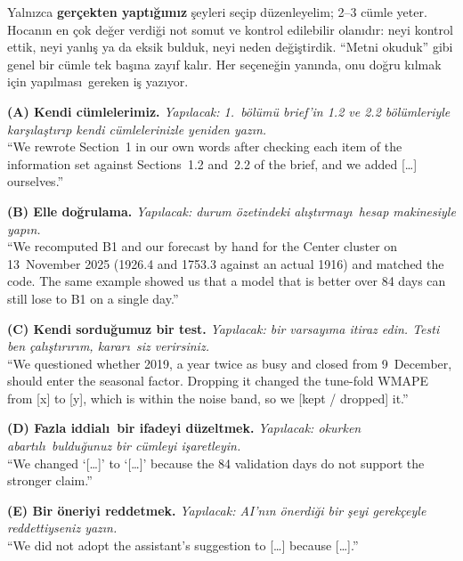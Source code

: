 \documentclass[10pt,a4paper]{article}
\begin{document}
\begin{tcolorbox}[enhanced, breakable, colback=red!2, colframe=red!55!black, boxrule=0.6pt,
  arc=2pt, left=6pt, right=6pt, top=4pt, bottom=4pt, fontupper=\small,
  title={\small\bfseries TASLAK -- grup i\c{c}in \"{o}neriler. Teslimden \"{o}nce bu kutuyu silin.}]
Yaln\i zca \textbf{ger\c{c}ekten yapt\i\u{g}\i m\i z} \c{s}eyleri se\c{c}ip d\"{u}zenleyelim; 2--3 c\"{u}mle yeter.
Hocan\i n en \c{c}ok de\u{g}er verdi\u{g}i not somut ve kontrol edilebilir olan\i d\i r: neyi kontrol ettik,
neyi yanl\i\c{s} ya da eksik bulduk, neyi neden de\u{g}i\c{s}tirdik. ``Metni okuduk'' gibi genel bir c\"{u}mle
tek ba\c{s}\i na zay\i f kal\i r. Her se\c{c}ene\u{g}in yan\i nda, onu do\u{g}ru k\i lmak i\c{c}in yap\i lmas\i\ gereken i\c{s} yaz\i yor.

\smallskip
\textbf{(A) Kendi c\"{u}mlelerimiz.} \emph{Yap\i lacak: 1.\ b\"{o}l\"{u}m\"{u} brief'in 1.2 ve 2.2 b\"{o}l\"{u}mleriyle
kar\c{s}\i la\c{s}t\i r\i p kendi c\"{u}mlelerinizle yeniden yaz\i n.}\\
``We rewrote Section~1 in our own words after checking each item of the information set against
Sections~1.2 and~2.2 of the brief, and we added [\dots] ourselves.''

\smallskip
\textbf{(B) Elle do\u{g}rulama.} \emph{Yap\i lacak: durum \"{o}zetindeki al\i\c{s}t\i rmay\i\ hesap makinesiyle
yap\i n.}\\
``We recomputed B1 and our forecast by hand for the Center cluster on 13~November 2025 (1926.4 and
1753.3 against an actual 1916) and matched the code. The same example showed us that a model that is
better over 84 days can still lose to B1 on a single day.''

\smallskip
\textbf{(C) Kendi sordu\u{g}umuz bir test.} \emph{Yap\i lacak: bir varsay\i ma itiraz edin. Testi ben
\c{c}al\i\c{s}t\i r\i r\i m, karar\i\ siz verirsiniz.}\\
``We questioned whether 2019, a year twice as busy and closed from 9~December, should enter the
seasonal factor. Dropping it changed the tune-fold WMAPE from [x] to [y], which is within the noise
band, so we [kept / dropped] it.''

\smallskip
\textbf{(D) Fazla iddial\i\ bir ifadeyi d\"{u}zeltmek.} \emph{Yap\i lacak: okurken abart\i l\i\ buldu\u{g}unuz
bir c\"{u}mleyi i\c{s}aretleyin.}\\
``We changed `[\dots]' to `[\dots]' because the 84 validation days do not support the stronger
claim.''

\smallskip
\textbf{(E) Bir \"{o}neriyi reddetmek.} \emph{Yap\i lacak: AI'n\i n \"{o}nerdi\u{g}i bir \c{s}eyi gerek\c{c}eyle
reddettiyseniz yaz\i n.}\\
``We did not adopt the assistant's suggestion to [\dots] because [\dots].''
\end{tcolorbox}
\end{document}
